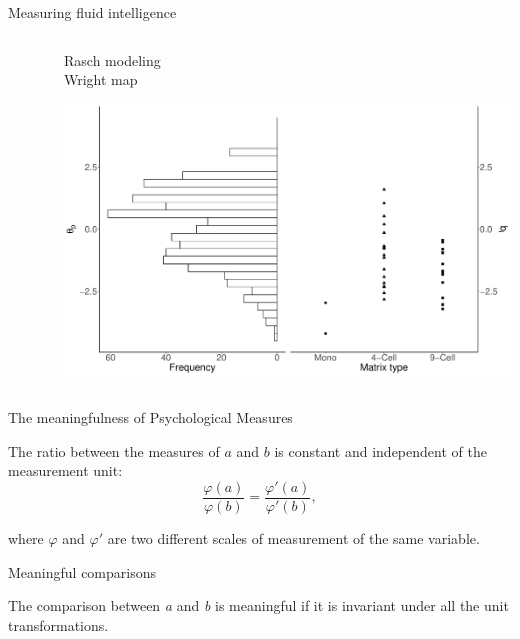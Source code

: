 \documentclass[aspectratio=149, xcolor=table]{beamer}
\begin{document}
\begin{frame}{Measuring fluid intelligence}
\begin{columns}[T]
\begin{column}{.50\linewidth}
\begin{figure}
			\end{figure}
		\end{column}
		\begin{column}{.50\linewidth}
				\begin{center}
				Rasch modeling\\
				\small{Wright map}
			\end{center}
			\includegraphics[width=\linewidth]{img/WrightMap.pdf}
		\end{column}
	\end{columns}
	

\end{frame}

\begin{frame}{The meaningfulness of Psychological Measures}
	
	The ratio between the measures of $a$ and $b$ is constant and independent of the measurement unit:
	\[
	\frac{\varphi(a)}{\varphi(b)} = \frac{\varphi'(a)}{\varphi'(b)},
	\]
	
	where $\varphi$ and $\varphi'$ are two different scales of measurement of the same variable.
	
	\begin{block}{Meaningful comparisons}
		
		The comparison between \emph{a} and \emph{b} is meaningful if it is invariant under all the unit transformations. 
		
	\end{block}
\end{frame}
\end{document}
